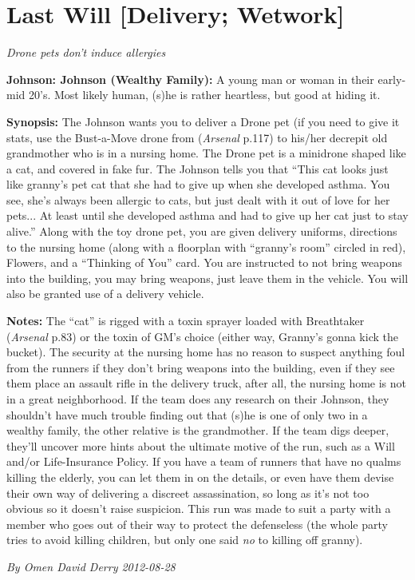\documentclass[letterpaper,twocolumn,10.5pt]{article}
\newenvironment{scenario}[6]
	{
		\section{#1 {\small[#2]}}
		\textit{#3}
		\def\TMPSCENARIO{#4 #5}
	}
	{\small\textit{By \TMPSCENARIO}}
\newcommand{\johnson}[2]{\textbf{Johnson: #1 (#2):}}
\newcommand{\synopsis}{\textbf{Synopsis: }}
\newcommand{\notes}{\textbf{Notes: }}
\begin{document}
\begin{scenario}{Last Will}
	{Delivery; Wetwork}
	{ Drone pets don't induce allergies}
	{Omen David Derry}
	{2012-08-28}
	{https://forum.rpg.net/showthread.php?321504-Shadowrun-4th-101-Instant-Scenarios\&p=15834341#post15834341}

\johnson{Johnson}{Wealthy Family}  A young man or woman in their early-mid 20's. Most likely human, (s)he is rather heartless, but good at hiding it.

\synopsis The Johnson wants you to deliver a Drone pet (if you need to give it stats, use the Bust-a-Move drone from (\textit{Arsenal} p.117) to his/her decrepit old grandmother who is in a nursing home. The Drone pet is a minidrone shaped like a cat, and covered in fake fur. The Johnson tells you that ``This cat looks just like granny's pet cat that she had to give up when she developed asthma. You see, she's always been allergic to cats, but just dealt with it out of love for her pets... At least until she developed asthma and had to give up her cat just to stay alive.'' Along with the toy drone pet, you are given delivery uniforms, directions to the nursing home (along with a floorplan with ``granny's room'' circled in red), Flowers, and a ``Thinking of You'' card. You are instructed to not bring weapons into the building, you may bring weapons, just leave them in the vehicle. You will also be granted use of a delivery vehicle.

\notes 
    The ``cat'' is rigged with a toxin sprayer loaded with Breathtaker (\textit{Arsenal} p.83) or the toxin of GM's choice (either way, Granny's gonna kick the bucket). The security at the nursing home has no reason to suspect anything foul from the runners if they don't bring weapons into the building, even if they see them place an assault rifle in the delivery truck, after all, the nursing home is not in a great neighborhood. If the team does any research on their Johnson, they shouldn't have much trouble finding out that (s)he is one of only two in a wealthy family, the other relative is the grandmother. If the team digs deeper, they'll uncover more hints about the ultimate motive of the run, such as a Will and/or Life-Insurance Policy. If you have a team of runners that have no qualms killing the elderly, you can let them in on the details, or even have them devise their own way of delivering a discreet assassination, so long as it's not too obvious so it doesn't raise suspicion. This run was made to suit a party with a member who goes out of their way to protect the defenseless (the whole party tries to avoid killing children, but only one said \textit{no} to killing off granny). 


\end{scenario}
\end{document}
